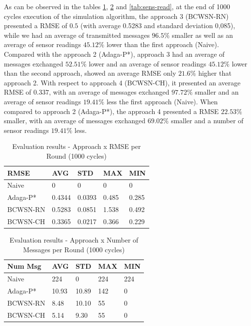 \documentclass[conference]{IEEEtran}
\begin{document}
As can be observed in the tables \ref{tab:rmse}, \ref{tab:num-msg} and
\ref{tab:sens-read}, at the end of 1000 cycles execution of the simulation
algorithm, the approach 3 (BCWSN-RN) presented a RMSE of $0.5$ (with average
0.5283 and standard deviation 0,085), while we had an average of transmitted
messages $96.5\%$ smaller as well as an average of sensor readings $45.12\%$
lower than the first approach (Naive). Compared with the approach 2 (Adaga-P*),
approach 3 had an average of messages exchanged $52.51\%$ lower and an average
of sensor readings $45.12\%$ lower than the second approach, showed an average
RMSE only $21.6\%$ higher that approach 2.
With respect to approach 4 (BCWSN-CH), it presented an average RMSE of $0.337$,
with an average of messages exchanged $97.72\%$ smaller and an average of sensor
readings $19.41\%$ less the first approach (Naive). When compared to approach 2
(Adaga-P*), the approach 4 presented a RMSE $22.53\%$ smaller, with an average
of messages exchanged $69.02\%$ smaller and a number of sensor readings
$19.41\%$ less.

\begin{table}[h!]
\caption{Evaluation results - Approach x RMSE per Round (1000 cycles)}
\label{tab:rmse}
\begin{center}
\begin{tabular}{|l||l|l|l|l|}
\hline
RMSE &AVG &STD &MAX &MIN \\
\hline\hline
Naive &0 &0 &0 &0 \\
\hline
Adaga-P* &0.4344 &0.0393 &0.485 &0.285 \\
\hline
BCWSN-RN &0.5283 &0.0851 &1.538 &0.492 \\
\hline
BCWSN-CH &0.3365 &0.0217 &0.366 &0.229 \\
\hline
\end{tabular}
\end{center}
\end{table}

\begin{table}[h!]
\caption{Evaluation results - Approach x Number of Messages per Round (1000 cycles)}
\label{tab:num-msg}
\begin{center}
\begin{tabular}{|l||l|l|l|l|}
\hline
Num Msg &AVG &STD &MAX &MIN \\
\hline\hline
Naive &224 &0 &224 &224 \\
\hline
Adaga-P* &10.93 &10.89 &142 &0 \\
\hline
BCWSN-RN &8.48 &10.10 &55 &0 \\
\hline
BCWSN-CH &5.14 &9.30 &55 &0 \\
\hline
\end{tabular}
\end{center}
\end{table}
\end{document}
